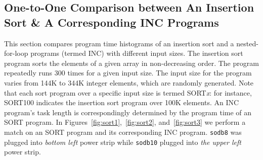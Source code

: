 \documentclass[10pt]{article}
\begin{document}
\clearpage
\pagebreak

\subsection{One-to-One Comparison between An Insertion Sort \& A Corresponding INC Programs~\label{sec:sort}} 
This section compares program time histograms 
of an insertion sort and a nested-for-loop programs (termed INC) with different input sizes. The insertion sort program sorts the elements of a given array in non-decreasing order.  The program repeatedly runs 300 times for a given input size. The input size for the program varies from 144K to 344K integer elements, which are randomly generated. Note that each sort program over a specific input size is termed SORT{\it x}: for instance, SORT100 indicates the insertion sort program over 100K elements. An INC program's task length is correspondingly determined by the program time of an SORT program. In Figures~\ref{fig:sort1},~\ref{fig:sort2}, and~\ref{fig:sort3} 
we perform a match on an SORT program and its corresponding INC program. 
{\tt sodb8} was plugged into {\em bottom left} power strip 
while {\tt sodb10} plugged into {\em the upper left} power strip. 

%
\end{document}
